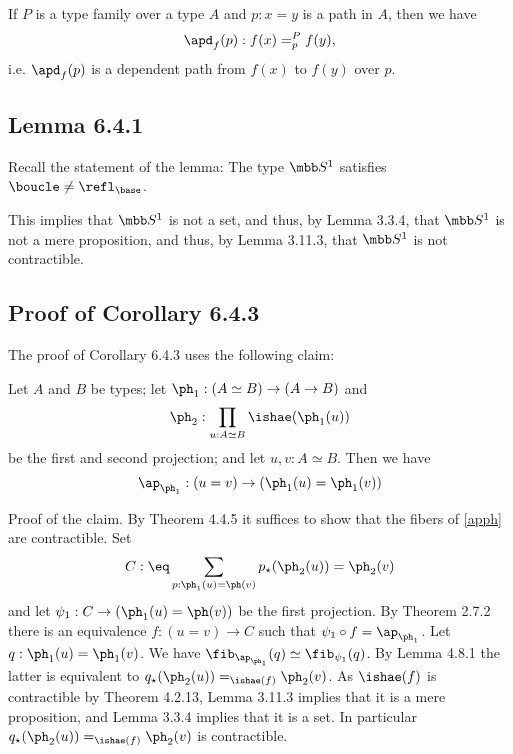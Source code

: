 \documentclass[12pt]{article}
\begin{document}
If $P$ is a type family over a type $A$ and $p:x=y$ is a path in $A$, then we have 
$$
\apd_f(p):f(x)=^P_pf(y),
$$ 
i.e. $\apd_f(p)$ is a dependent path from $f(x)$ to $f(y)$ over $p$.


\subsection{Lemma 6.4.1}

Recall the statement of the lemma: The type $\mbb S^1$ satisfies $\boucle\neq\refl_{\base}$. 

This implies that $\mbb S^1$ is not a set, and thus, by Lemma 3.3.4, that $\mbb S^1$ is not a mere proposition, and thus, by Lemma 3.11.3, that $\mbb S^1$ is not contractible.


\subsection{Proof of Corollary 6.4.3} %


The proof of Corollary 6.4.3 uses the following claim:

\nn Let $A$ and $B$ be types; let $\ph_1:(A\simeq B)\to(A\to B)$ and 
$$
\ph_2:\prod_{u:A\simeq B}\ishae(\ph_1(u))
$$ 
be the first and second projection; and let $u,v:A\simeq B$. Then we have 
\begin{equation}\label{apph}
\ap_{\ph_1}:(u=v)\to(\ph_1(u)=\ph_1(v))
\end{equation}%

\nn Proof of the claim. By Theorem 4.4.5 it suffices to show that the fibers of \eqref{apph} are contractible. Set 
$$
C:\eq\sum_{p:\ph_1(u)=\ph(v)}p_\star(\ph_2(u))=\ph_2(v)
$$ 
and let $\psi_1:C\to(\ph_1(u)=\ph(v))$ be the first projection. By Theorem 2.7.2 there is an equivalence $f:(u=v)\to C$ such that $\psi_1\circ f=\ap_{\ph_1}$. Let $q:\ph_1(u)=\ph_1(v)$. We have $\fib_{\ap_{\ph_1}}(q)\simeq\fib_{\psi_1}(q)$. By Lemma 4.8.1 the latter is equivalent to $q_\star(\ph_2(u))=_{\ishae(f)}\ph_2(v)$. As $\ishae(f)$ is contractible by Theorem 4.2.13, Lemma 3.11.3 implies that it is a mere proposition, and Lemma 3.3.4 implies that it is a set. In particular $q_\star(\ph_2(u))=_{\ishae(f)}\ph_2(v)$ is contractible.
\end{document}

